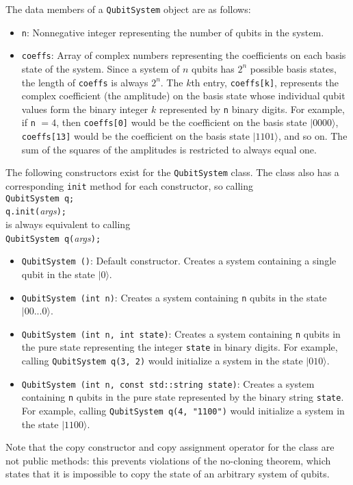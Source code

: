\documentclass{article}
\begin{document}
The data members of a \verb~QubitSystem~ object are as follows: 
\begin{itemize}
\item \verb~n~: Nonnegative integer representing the number of qubits in the system. 
\item \verb~coeffs~: Array of complex numbers representing the coefficients on each basis state of the system. Since a system of $n$ qubits has $2^n$ possible basis states, the length of \verb~coeffs~ is always $2^n$. The $k$th entry, \verb~coeffs[k]~, represents the complex coefficient (the amplitude) on the basis state whose individual qubit values form the binary integer $k$ represented by \verb~n~ binary digits. For example, if \verb~n~ $= 4$, then \verb~coeffs[0]~ would be the coefficient on the basis state $|0000\rangle$, \verb~coeffs[13]~ would be the coefficient on the basis state $|1101\rangle$, and so on. The sum of the squares of the amplitudes is restricted to always equal one. 
\end{itemize}

The following constructors exist for the \verb~QubitSystem~ class. The class also has a corresponding \verb~init~ method for each constructor, so calling \\
\hspace*{1em} \verb~QubitSystem q;~ \\
\hspace*{1em} \verb~q.init(~\emph{args}\verb~);~ \\
is always equivalent to calling \\
\hspace*{1em} \verb~QubitSystem q(~\emph{args}\verb~);~ 
\begin{itemize}
\item \verb~QubitSystem ()~: Default constructor. Creates a system containing a single qubit in the state $|0\rangle$. 
\item \verb~QubitSystem (int n)~: Creates a system containing \verb~n~ qubits in the state $|00...0\rangle$. 
\item \verb~QubitSystem (int n, int state)~: Creates a system containing \verb~n~ qubits in the pure state representing the integer \verb~state~ in binary digits. For example, calling \verb~QubitSystem q(3, 2)~ would initialize a system in the state $|010\rangle$. 
\item \verb~QubitSystem (int n, const std::string state)~: Creates a system containing \verb~n~ qubits in the pure state represented by the binary string \verb~state~. For example, calling \verb~QubitSystem q(4, "1100")~ would initialize a system in the state $|1100\rangle$. 
\end{itemize}
Note that the copy constructor and copy assignment operator for the class are not public methods: this prevents violations of the no-cloning theorem, which states that it is impossible to copy the state of an arbitrary system of qubits. 
\end{document}
